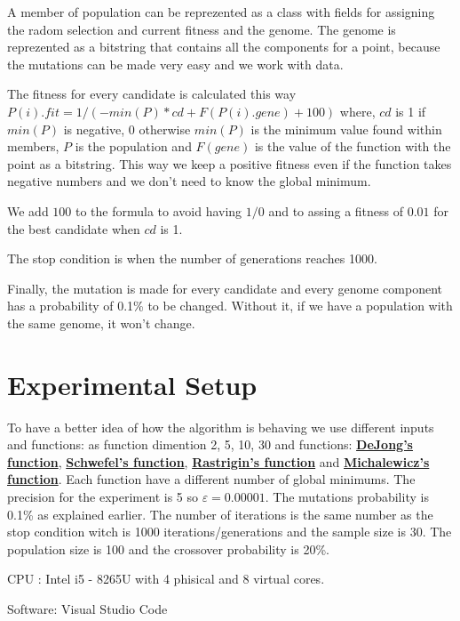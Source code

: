 \documentclass[12pt,leqno]{article}
\begin{document}
  A member of population can be reprezented as a class with fields for assigning the radom selection and current fitness
  and the genome. The genome is reprezented as a bitstring that contains all the components for a point, because the mutations can be made very easy and we work with data. 

  The fitness for every candidate is calculated this way $ P(i).fit = 1 / ( - min(P) * cd + F(P(i).gene) + 100) $ where, $ cd $ is 1 if $ min(P) $ is negative, 0 otherwise $min(P)$ is the minimum value found within members, $P$ is the population and $F(gene)$ is the value of the function with the point as a bitstring. This way we keep a positive fitness even if the function takes negative numbers and we don't need to know the global minimum.
  
  We add $100$ to the formula to avoid having $1 / 0$ and to assing a fitness of $0.01$ for the best candidate when $cd$ is 1.
  
  The stop condition is when the number of generations reaches 1000.

  Finally, the mutation is made for every candidate and every genome component has a probability of 0.1\% to be changed. Without it, if we have a population with the same genome, it won't change.


\section{Experimental Setup}
  To have a better idea of how the algorithm is behaving we use different inputs and functions: as function dimention 2, 5, 10, 30 and functions: \href{http://www.geatbx.com/docu/fcnindex-01.html#P89_3085}{\textbf{DeJong's function}}, \href{http://www.geatbx.com/docu/fcnindex-01.html#P150_6749}{\textbf{Schwefel's function}},
  \href{http://www.geatbx.com/docu/fcnindex-01.html#P140_6155}{\textbf{Rastrigin's function}} and \href{http://www.geatbx.com/docu/fcnindex-01.html#P204_10395}{\textbf{Michalewicz's function}}. Each function have a different number of global minimums. The precision for the experiment is 5 so $ \varepsilon = 0.00001 $. The mutations probability is 0.1\% as explained earlier.
  The number of iterations is the same number as the stop condition witch is 1000 iterations/generations and the sample size is 30. The population size is 100 and the crossover probability is 20\%.

  CPU : Intel i5 - 8265U with 4 phisical and 8 virtual cores.

  Software: Visual Studio Code
\end{document}
